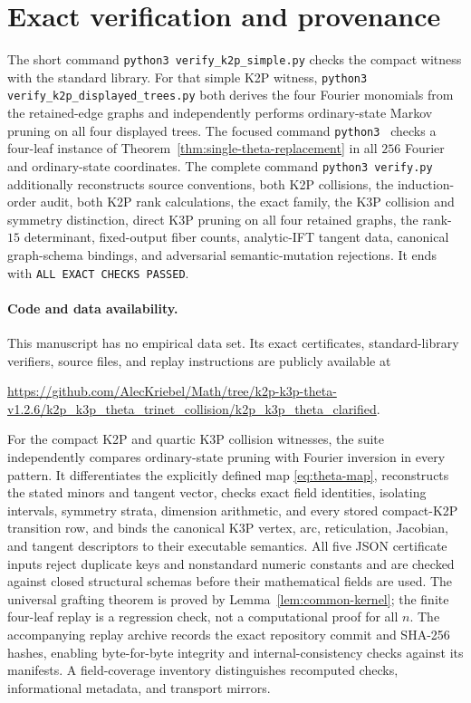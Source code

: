 \documentclass[11pt]{article}
\theoremstyle{remark}\newtheorem{remark}[theorem]{Remark}
\begin{document}
\section{Exact verification and provenance}
The short command \texttt{python3 verify\_k2p\_simple.py} checks the compact witness with the standard library. For that simple K2P witness, \texttt{python3 verify\_k2p\_displayed\_trees.py} both derives the four Fourier monomials from the retained-edge graphs and independently performs ordinary-state Markov pruning on all four displayed trees. The focused command \texttt{python3 } checks a four-leaf instance of Theorem~\ref{thm:single-theta-replacement} in all $256$ Fourier and ordinary-state coordinates. The complete command \texttt{python3 verify.py} additionally reconstructs source conventions, both K2P collisions, the induction-order audit, both K2P rank calculations, the exact family, the K3P collision and symmetry distinction, direct K3P pruning on all four retained graphs, the rank-$15$ determinant, fixed-output fiber counts, analytic-IFT tangent data, canonical graph-schema bindings, and adversarial semantic-mutation rejections. It ends with \texttt{ALL EXACT CHECKS PASSED}.

\paragraph{Code and data availability.}
This manuscript has no empirical data set. Its exact certificates, standard-library verifiers, source files, and replay instructions are publicly available at
\begin{center}
\url{https://github.com/AlecKriebel/Math/tree/k2p-k3p-theta-v1.2.6/k2p_k3p_theta_trinet_collision/k2p_k3p_theta_clarified}.
\end{center}
For the compact K2P and quartic K3P collision witnesses, the suite independently compares ordinary-state pruning with Fourier inversion in every pattern. It differentiates the explicitly defined map \eqref{eq:theta-map}, reconstructs the stated minors and tangent vector, checks exact field identities, isolating intervals, symmetry strata, dimension arithmetic, and every stored compact-K2P transition row, and binds the canonical K3P vertex, arc, reticulation, Jacobian, and tangent descriptors to their executable semantics. All five JSON certificate inputs reject duplicate keys and nonstandard numeric constants and are checked against closed structural schemas before their mathematical fields are used. The universal grafting theorem is proved by Lemma~\ref{lem:common-kernel}; the finite four-leaf replay is a regression check, not a computational proof for all $n$. The accompanying replay archive records the exact repository commit and SHA-256 hashes, enabling byte-for-byte integrity and internal-consistency checks against its manifests. A field-coverage inventory distinguishes recomputed checks, informational metadata, and transport mirrors.
\end{document}
